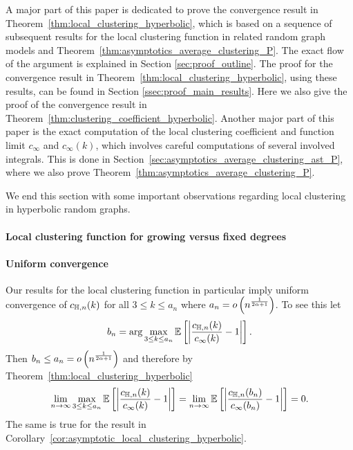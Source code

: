 A major part of this paper is dedicated to prove the convergence result in Theorem~\ref{thm:local_clustering_hyperbolic}, which is based on a sequence of subsequent results for the local clustering function in related random graph models and Theorem~\ref{thm:asymptotics_average_clustering_P}. The exact flow of the argument is explained in Section \ref{sec:proof_outline}. The proof for the convergence result in Theorem~\ref{thm:local_clustering_hyperbolic}, using these results, can be found in Section \ref{ssec:proof_main_results}. Here we also give the proof of the convergence result in Theorem~\ref{thm:clustering_coefficient_hyperbolic}. Another major part of this paper is the exact computation of the local clustering coefficient and function limit $c_\infty$ and $c_\infty(k)$, which involves careful computations of several involved integrals. This is done in Section~\ref{sec:asymptotics_average_clustering_ast_P}, where we also prove Theorem~\ref{thm:asymptotics_average_clustering_P}.

We end this section with some important observations regarding local clustering in hyperbolic random graphs.


\paragraph{Local clustering function for growing versus fixed degrees}
 

\paragraph{Uniform convergence}

Our results for the local clustering function in particular imply uniform convergence of $c_{\mathbb{H},n}(k)$ for all $3 \le k \le a_n$ where $a_n = o\left(n^{\frac{1}{2\alpha + 1}}\right)$. To see this let
\[
	b_n = \arg \max_{3 \le k \le a_n} \mathbb{E}\left[\left|\frac{c_{\mathbb{H} ,n}(k)}{c_\infty(k)} - 1\right|\right].
\]
Then $b_n \le a_n = o\left(n^{\frac{1}{2\alpha + 1}}\right)$ and therefore by Theorem~\ref{thm:local_clustering_hyperbolic}
\[
	\lim_{n \to \infty} \max_{3 \le k \le a_n} \mathbb{E}\left[\left|\frac{c_{\mathbb{H} ,n}(k)}{c_\infty(k)} - 1\right|\right] 
	= \lim_{n \to \infty}\mathbb{E}\left[\left|\frac{c_{\mathbb{H} ,n}(b_n)}{c_\infty(b_n)} - 1\right|\right] = 0.
\]
The same is true for the result in Corollary~\ref{cor:asymptotic_local_clustering_hyperbolic}.

